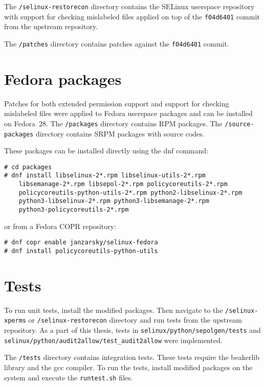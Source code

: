 The \texttt{/selinux-restorecon} directory contains the SELinux userspace
repository with support for checking mislabeled files applied on top of the
\texttt{f04d6401} commit from the upstream repository.

The \texttt{/patches} directory contains patches against the \texttt{f04d6401}
commit.

\section{Fedora packages}

Patches for both extended permission support and support for checking mislabeled
files were applied to Fedora userspace packages and can be installed on
Fedora~28. The \texttt{/packages} directory contains RPM packages. The
\texttt{/source-packages} directory contains SRPM packages with source codes.

These packages can be installed directly using the dnf command:
\begin{lstlisting}
# cd packages
# dnf install libselinux-2*.rpm libselinux-utils-2*.rpm
    libsemanage-2*.rpm libsepol-2*.rpm policycoreutils-2*.rpm
    policycoreutils-python-utils-2*.rpm python2-libselinux-2*.rpm
    python3-libselinux-2*.rpm python3-libsemanage-2*.rpm
    python3-policycoreutils-2*.rpm
\end{lstlisting}
or from a Fedora COPR repository:
\begin{lstlisting}
# dnf copr enable janzarsky/selinux-fedora
# dnf install policycoreutils-python-utils
\end{lstlisting}

\section{Tests}
To run unit tests, install the modified packages. Then navigate to the
\texttt{/selinux-xperms} or \texttt{/selinux-restorecon} directory and run tests
from the upstream repository. As a part of this thesis, tests in
\texttt{selinux/\allowbreak python/\allowbreak sepolgen/\allowbreak tests} and 
\texttt{selinux/\allowbreak python/\allowbreak audit2allow/\allowbreak test\_audit2allow}
were implemented.

The \texttt{/tests} directory contains integration tests. These tests require
the beakerlib library and the gcc compiler. To run the tests, install modified
packages on the system and execute the \texttt{runtest.sh} files.

